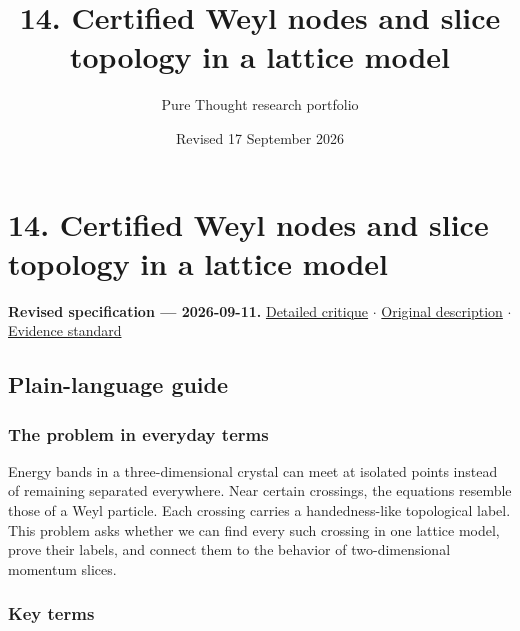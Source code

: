 \documentclass[
  11pt,
]{article}
\title{14. Certified Weyl nodes and slice topology in a lattice model}
\author{Pure Thought research portfolio}
\date{Revised 17 September 2026}
\begin{document}
\maketitle
\thispagestyle{empty}
\clearpage

\section{14. Certified Weyl nodes and slice topology in a lattice model}

\textbf{Revised specification --- 2026-09-11.}
\href{https://github.com/rick-stevens-ai/Pure-Thought/blob/main/reviews/14-Topological-Semimetals-Weyl-Dirac.md}{Detailed
critique} \ensuremath{\cdot}
\href{https://github.com/rick-stevens-ai/Pure-Thought/blob/main/archive/original-PRDs/14-Topological-Semimetals-Weyl-Dirac.md}{Original
description} \ensuremath{\cdot}
\href{https://github.com/rick-stevens-ai/Pure-Thought/blob/main/reviews/EVIDENCE-STANDARD.md}{Evidence
standard}

\subsection{Plain-language guide}

\subsubsection{The problem in everyday terms}

Energy bands in a three-dimensional crystal can meet at isolated points
instead of remaining separated everywhere. Near certain crossings, the
equations resemble those of a Weyl particle. Each crossing carries a
handedness-like topological label. This problem asks whether we can find
every such crossing in one lattice model, prove their labels, and
connect them to the behavior of two-dimensional momentum slices.

\subsubsection{Key terms}
\end{document}
